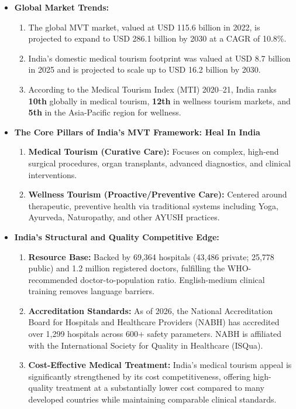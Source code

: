 \begin{itemize}
    \item \textbf{ Global Market Trends:}
    \begin{enumerate}
        \item The global MVT market, valued at USD 115.6 billion in 2022, is projected to expand to USD 286.1 billion by 2030 at a CAGR of 10.8\%.
        \item India's domestic medical tourism footprint was valued at USD 8.7 billion in 2025 and is projected to scale up to USD 16.2 billion by 2030.
        \item According to the Medical Tourism Index (MTI) 2020--21, India ranks \textbf{10th} globally in medical tourism, \textbf{12th} in wellness tourism markets, and \textbf{5th} in the Asia-Pacific region for wellness.
    \end{enumerate}

    \item \textbf{The Core Pillars of India's MVT Framework: Heal In India}
    \begin{enumerate}
        \item \textbf{Medical Tourism (Curative Care):} Focuses on complex, high-end surgical procedures, organ transplants, advanced diagnostics, and clinical interventions.
        \item \textbf{Wellness Tourism (Proactive/Preventive Care):} Centered around therapeutic, preventive health via traditional systems including Yoga, Ayurveda, Naturopathy, and other AYUSH practices.
    \end{enumerate}
    \item \textbf{India's Structural and Quality Competitive Edge:}
    \begin{enumerate}
        \item \textbf{Resource Base:} Backed by 69,364 hospitals (43,486 private; 25,778 public) and 1.2 million registered doctors, fulfilling the WHO-recommended doctor-to-population ratio. English-medium clinical training removes language barriers.
        \item \textbf{Accreditation Standards:} As of 2026, the National Accreditation Board for Hospitals and Healthcare Providers (NABH) has accredited over 1,299 hospitals across 600+ safety parameters. NABH is affiliated with the International Society for Quality in Healthcare (ISQua).
        \item \textbf{Cost-Effective Medical Treatment:} India’s medical tourism appeal is significantly strengthened by its cost competitiveness, offering high-quality treatment at a substantially lower cost compared to many developed countries while maintaining comparable clinical standards.


\end{enumerate}
\end{itemize}
